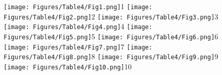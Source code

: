 \documentclass[a4paper, 11pt, oneside]{article}
\begin{document}
\clearpage
{}
\cfoot{\thepage}
\begin{figure}[p]
\texttt{[image: Figures/Table4/Fig1.png]}\tiny 1
\texttt{[image: Figures/Table4/Fig2.png]}\tiny 2
\texttt{[image: Figures/Table4/Fig3.png]}\tiny 3
\texttt{[image: Figures/Table4/Fig4.png]}\tiny 4
\texttt{[image: Figures/Table4/Fig5.png]}\tiny 5
\texttt{[image: Figures/Table4/Fig6.png]}\tiny 6
\texttt{[image: Figures/Table4/Fig7.png]}\tiny 7
\texttt{[image: Figures/Table4/Fig8.png]}\tiny 8
\texttt{[image: Figures/Table4/Fig9.png]}\tiny 9
\texttt{[image: Figures/Table4/Fig10.png]}\tiny 10
\end{figure}
\clearpage
\end{document}
